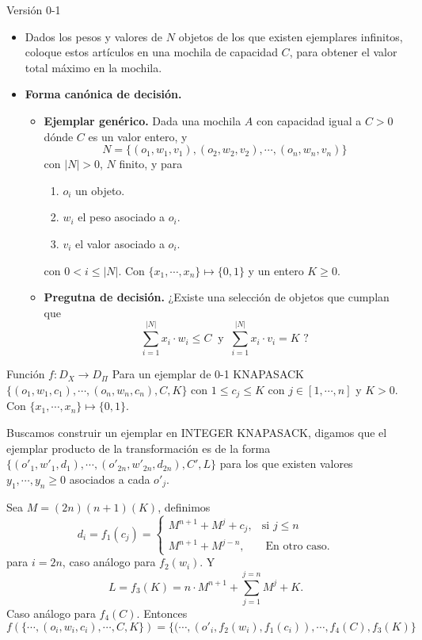 \begin{frame}{Versión 0-1}
     \begin{itemize}[<+->]
     \item Dados los pesos y valores de $N$ objetos de los que existen ejemplares infinitos, coloque estos artículos
       en una mochila de capacidad $C$, para obtener el valor total máximo en la mochila.
       
     \item \textbf{Forma canónica de decisión.}
       \begin{itemize}[<+->]
       \item \textbf{Ejemplar genérico.} Dada una mochila $A$ con capacidad igual a $C > 0$
         dónde $C$ es un valor entero, y
         \[N = \{(o_1, w_1, v_1), (o_2, w_2, v_2), \dotsm, (o_n, w_n, v_n)\}\]
         con $|N| > 0$, $N$ finito,  y para
         \begin{enumerate}
         \item $o_i$ un objeto. 
         \item $w_i$ el peso asociado a $o_i$.
         \item $v_i$ el valor asociado a $o_i$.
         \end{enumerate}
         con $0 < i \leq |N|$. Con $\{x_1, \dotsm, x_n\} \mapsto \{0, 1\}$ y un entero $K \geq 0$. 
       \item \textbf{Pregutna de decisión.} ¿Existe una selección de objetos que cumplan que
         \[\sum_{i=1}^{|N|} x_i \cdot w_i \leq C\ \text{  y  }\ \sum_{i=1}^{|N|} x_i \cdot v_i = K \text{ ?}\]
       \end{itemize}
     \end{itemize}
\end{frame}

\begin{frame}{Función $f: D_X \rightarrow D_{\Pi}$}
  Para un ejemplar de 0-1 KNAPASACK $\{(o_1, w_1, c_1), \dotsm, (o_n, w_n, c_n), C, K\}$
  con $1 \leq c_j \leq K$ con $j \in [1, \dotsm, n]$ y $K > 0$. Con $\{x_1, \dotsm, x_n\} \mapsto \{0, 1\}$.\newline

  Buscamos construir un ejemplar en INTEGER KNAPASACK, digamos que el ejemplar producto
  de la transformación es de la forma $\{(o'_1, w'_1, d_1), \dotsm, (o'_{2n}, w'_{2n}, d_{2n}), C', L\}$ para los que existen
  valores $y_1, \dotsm, y_n \geq 0$ asociados a cada $o'_j$.\newline
  
  Sea $M = (2n)(n + 1)(K)$, definimos
  \[
  d_i = f_1(c_j) =
  \begin{cases}
    M^{n + 1} + M^j + c_j, & \text{si } j \leq n \\
    M^{n + 1} + M^{j - n}, & \text{ En otro caso}.
  \end{cases}
  \]
  para $i = 2n$, caso análogo para $f_2(w_i)$. Y \[L = f_3(K) = n \cdot M^{n + 1} + \sum_{j = 1}^{j = n}M^j + K.\]
  Caso análogo para $f_4(C)$. Entonces
  \[f(\{\dotsm, (o_i, w_i, c_i), \dotsm, C, K\}) =
  \{( \dotsm, (o'_{i}, f_2(w_{i}), f_1(c_{i})), \dotsm,  f_4(C), f_3(K)\}\]
\end{frame}

